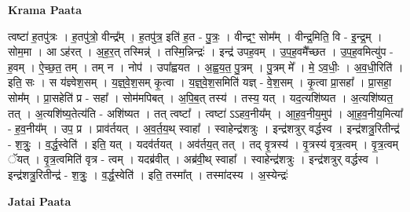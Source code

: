 \documentclass[17pt]{extarticle}
\begin{document}
\textbf{Krama Paata} \newline

त्वष्टा॑ ह॒तपु॑त्रः । ह॒तपु॑त्रो॒ वीन्द्र᳚म् । ह॒तपु॑त्र॒ इति॑ ह॒त - पु॒त्रः॒ । वीन्द्रꣳ॒॒ सोम᳚म् । वीन्द्र॒मिति॒ वि - इ॒न्द्र॒म् । सोम॒मा । आ ऽह॑रत् । अ॒ह॒र॒त् तस्मिन्न्॑ । तस्मि॒न्निन्द्रः॑ । इन्द्र॑ उपह॒वम् । उ॒प॒ह॒वमै᳚च्छत । उ॒प॒ह॒वमित्यु॑प - ह॒वम् । ऐ॒च्छ॒त॒ तम् । तम् न । नोप॑ । उपा᳚ह्वयत । अ॒ह्व॒य॒त॒ पु॒त्रम् । पु॒त्रम् मे᳚ । मे॒ ऽव॒धीः॒ । अ॒व॒धी॒रिति॑ । इति॒ सः । स य॑ज्ञ्वेश॒सम् । य॒ज्ञ्॒वे॒श॒सम् कृ॒त्वा । य॒ज्ञ्॒वे॒श॒समिति॑ यज्ञ् - वे॒श॒सम् । कृ॒त्वा प्रा॒सहा᳚ । प्रा॒सहा॒ सोम᳚म् । प्रा॒सहेति॑ प्र - सहा᳚ । सोम॑मपिबत् । अ॒पि॒ब॒त् तस्य॑ । तस्य॒ यत् । यद॒त्यशि॑ष्यत । अ॒त्यशि॑ष्यत॒ तत् । अ॒त्यशि॑ष्य॒तेत्य॑ति - अशि॑ष्यत । तत् त्वष्टा᳚ । त्वष्टा॑ ऽऽहव॒नीय᳚म् । आ॒ह॒व॒नीय॒मुप॑ । आ॒ह॒व॒नीय॒मित्या᳚ - ह॒व॒नीय᳚म् । उप॒ प्र । प्राव॑र्तयत् । अ॒व॒र्त॒य॒थ् स्वाहा᳚ । स्वाहेन्द्र॑शत्रुः । इन्द्र॑शत्रुर् वर्द्धस्व । इन्द्र॑शत्रु॒रितीन्द्र॑ - श॒त्रुः॒ । व॒र्द्ध॒स्वेति॑ । इति॒ यत् । यदव॑र्तयत् । अव॑र्तय॒त् तत् । तद् वृ॒त्रस्य॑ । वृ॒त्रस्य॑ वृत्र॒त्वम् । वृ॒त्र॒त्वम् ॅयत् । वृ॒त्र॒त्वमिति॑ वृत्र - त्वम् । यदब्र॑वीत् । अब्र॑वी॒थ् स्वाहा᳚ । स्वाहेन्द्र॑शत्रुः । इन्द्र॑शत्रुर् वर्द्धस्व । इन्द्र॑शत्रु॒रितीन्द्र॑ - श॒त्रुः॒ । व॒र्द्ध॒स्वेति॑ । इति॒ तस्मा᳚त् । तस्मा॑दस्य । अ॒स्येन्द्रः॑ \newline

\textbf{Jatai Paata} \newline
\end{document}
